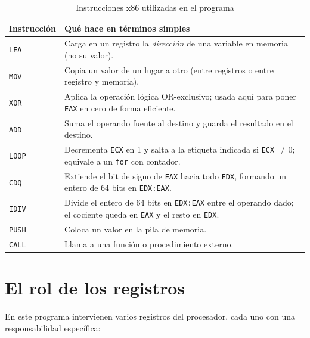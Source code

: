 \documentclass[12pt, letterpaper]{article}
\begin{document}
\begin{table}[H]
    \centering
    \begin{tabular}{@{}lp{9cm}@{}}
        \toprule
        \textbf{Instrucción} & \textbf{Qué hace en términos simples} \\
        \midrule
        \texttt{LEA}  & Carga en un registro la \textit{dirección} de una variable en memoria (no su valor). \\
        \texttt{MOV}  & Copia un valor de un lugar a otro (entre registros o entre registro y memoria). \\
        \texttt{XOR}  & Aplica la operación lógica OR-exclusivo; usada aquí para poner \texttt{EAX} en cero de forma eficiente. \\
        \texttt{ADD}  & Suma el operando fuente al destino y guarda el resultado en el destino. \\
        \texttt{LOOP} & Decrementa \texttt{ECX} en 1 y salta a la etiqueta indicada si \texttt{ECX} $\neq 0$; equivale a un \texttt{for} con contador. \\
        \texttt{CDQ}  & Extiende el bit de signo de \texttt{EAX} hacia todo \texttt{EDX}, formando un entero de 64 bits en \texttt{EDX:EAX}. \\
        \texttt{IDIV} & Divide el entero de 64 bits en \texttt{EDX:EAX} entre el operando dado; el cociente queda en \texttt{EAX} y el resto en \texttt{EDX}. \\
        \texttt{PUSH} & Coloca un valor en la pila de memoria. \\
        \texttt{CALL} & Llama a una función o procedimiento externo. \\
        \bottomrule
    \end{tabular}
    \caption{Instrucciones x86 utilizadas en el programa}
\end{table}

\section{El rol de los registros}

En este programa intervienen varios registros del procesador, cada uno con una responsabilidad específica:
\end{document}
